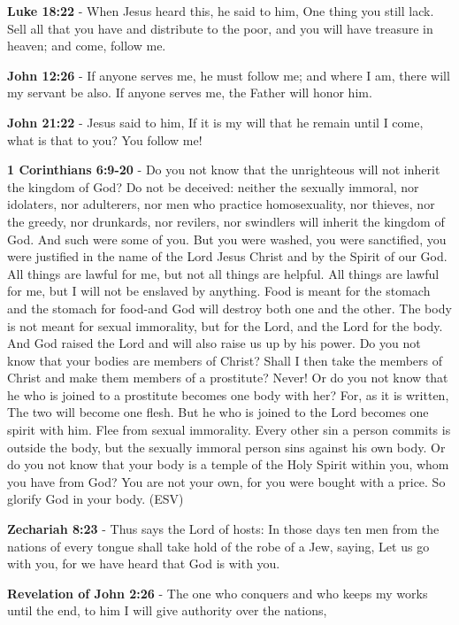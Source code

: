 \documentclass[11pt]{article}
\begin{document}
\textbf{Luke 18:22} - When Jesus heard this, he said to him, One thing you still lack. Sell all that you have and distribute to the poor, and you will have treasure in heaven; and come, follow me.

\textbf{John 12:26} - If anyone serves me, he must follow me; and where I am, there will my servant be also. If anyone serves me, the Father will honor him.

\textbf{John 21:22} - Jesus said to him, If it is my will that he remain until I come, what is that to you? You follow me!

\textbf{1 Corinthians 6:9-20} - Do you not know that the unrighteous will not inherit the kingdom of God? Do not be deceived: neither the sexually immoral, nor idolaters, nor adulterers, nor men who practice homosexuality, nor thieves, nor the greedy, nor drunkards, nor revilers, nor swindlers will inherit the kingdom of God. And such were some of you. But you were washed, you were sanctified, you were justified in the name of the Lord Jesus Christ and by the Spirit of our God. All things are lawful for me, but not all things are helpful. All things are lawful for me, but I will not be enslaved by anything. Food is meant for the stomach and the stomach for food-and God will destroy both one and the other. The body is not meant for sexual immorality, but for the Lord, and the Lord for the body. And God raised the Lord and will also raise us up by his power. Do you not know that your bodies are members of Christ? Shall I then take the members of Christ and make them members of a prostitute? Never! Or do you not know that he who is joined to a prostitute becomes one body with her? For, as it is written, The two will become one flesh. But he who is joined to the Lord becomes one spirit with him. Flee from sexual immorality. Every other sin a person commits is outside the body, but the sexually immoral person sins against his own body. Or do you not know that your body is a temple of the Holy Spirit within you, whom you have from God? You are not your own, for you were bought with a price. So glorify God in your body. (ESV)

\textbf{Zechariah 8:23} - Thus says the Lord of hosts: In those days ten men from the nations of every tongue shall take hold of the robe of a Jew, saying, Let us go with you, for we have heard that God is with you.

\textbf{Revelation of John 2:26} - The one who conquers and who keeps my works until the end, to him I will give authority over the nations,
\end{document}
